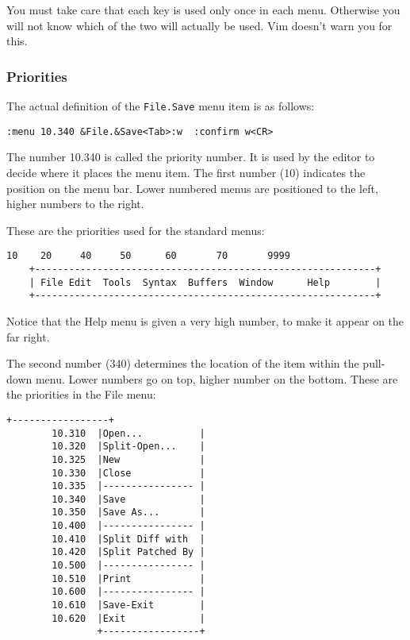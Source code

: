 You must take care that each key is used only once in each menu.
Otherwise you will not know which of the two will actually be used.
Vim doesn't warn you for this.

\subsubsection{Priorities}
The actual definition of the \verb!File.Save! menu item is as follows:

\begin{Verbatim}[samepage=true]
 :menu 10.340 &File.&Save<Tab>:w  :confirm w<CR>
\end{Verbatim}

The number 10.340 is called the priority number.
It is used by the editor to decide where it places the menu item.
The first number (10) indicates the position on the menu bar.
Lower numbered menus are positioned to the left, higher numbers to the right.

These are the priorities used for the standard menus:
\begin{Verbatim}[samepage=true]
      10    20     40     50      60       70       9999
    +------------------------------------------------------------+
    | File Edit  Tools  Syntax  Buffers  Window      Help        |
    +------------------------------------------------------------+
\end{Verbatim}

Notice that the Help menu is given a very high number, to make it appear on the far right.

The second number (340) determines the location of the item within the pull-down menu.
Lower numbers go on top, higher number on the bottom.
These are the priorities in the File menu:

\begin{Verbatim}[samepage=true]
                +-----------------+
        10.310  |Open...          |
        10.320  |Split-Open...    |
        10.325  |New              |
        10.330  |Close            |
        10.335  |---------------- |
        10.340  |Save             |
        10.350  |Save As...       |
        10.400  |---------------- |
        10.410  |Split Diff with  |
        10.420  |Split Patched By |
        10.500  |---------------- |
        10.510  |Print            |
        10.600  |---------------- |
        10.610  |Save-Exit        |
        10.620  |Exit             |
                +-----------------+
\end{Verbatim}

